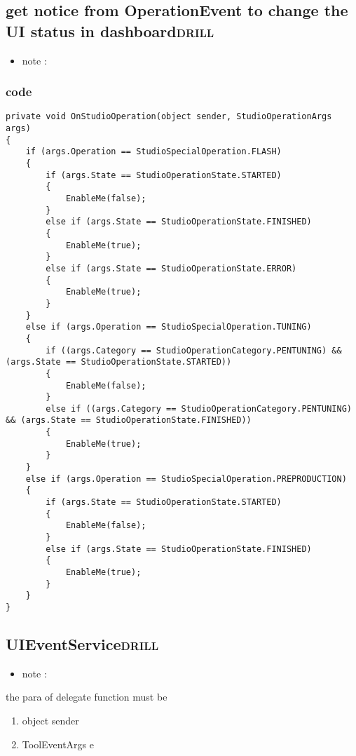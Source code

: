 \documentclass[11pt]{article}
\begin{document}
\subsection{get notice from OperationEvent to change the UI status in dashboard\hfill{}\textsc{drill}}
\label{sec:org13e71cc}
\begin{itemize}
\item note :
\end{itemize}
\subsubsection{code}
\label{sec:org93a8f9d}
\begin{verbatim}
private void OnStudioOperation(object sender, StudioOperationArgs args)
{
    if (args.Operation == StudioSpecialOperation.FLASH)
    {
        if (args.State == StudioOperationState.STARTED)
        {
            EnableMe(false);
        }
        else if (args.State == StudioOperationState.FINISHED)
        {
            EnableMe(true);
        }
        else if (args.State == StudioOperationState.ERROR)
        {
            EnableMe(true);
        }
    }
    else if (args.Operation == StudioSpecialOperation.TUNING)
    {
        if ((args.Category == StudioOperationCategory.PENTUNING) && (args.State == StudioOperationState.STARTED))
        {
            EnableMe(false);
        }
        else if ((args.Category == StudioOperationCategory.PENTUNING) && (args.State == StudioOperationState.FINISHED))
        {
            EnableMe(true);
        }
    }
    else if (args.Operation == StudioSpecialOperation.PREPRODUCTION)
    {
        if (args.State == StudioOperationState.STARTED)
        {
            EnableMe(false);
        }
        else if (args.State == StudioOperationState.FINISHED)
        {
            EnableMe(true);
        }
    }
}

\end{verbatim}

\subsection{UIEventService\hfill{}\textsc{drill}}
\label{sec:org779b3cc}
\begin{itemize}
\item note :
\end{itemize}
the para of delegate function must be 
\begin{enumerate}
\item object sender
\item ToolEventArgs e
\end{enumerate}
\end{document}
